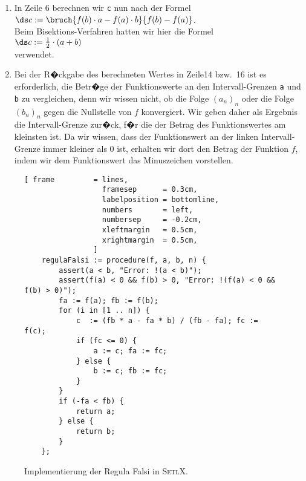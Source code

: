 \begin{enumerate}
\item In Zeile 6 berechnen wir \texttt{c} nun nach der Formel
      \\[0.2cm]
      \hspace*{1.3cm}
      $\ds c := \bruch{f(b) \cdot a - f(a) \cdot b}{f(b) - f(a)}$. 
      \\[0.2cm]
      Beim Bisektions-Verfahren hatten wir hier die Formel
      \\[0.2cm]
      \hspace*{1.3cm}
      $\ds c := \frac{1}{2} \cdot (a + b)$
      \\[0.2cm]
      verwendet.
\item Bei der R�ckgabe des berechneten Wertes in Zeile14 bzw.~16 ist es erforderlich, die Betr�ge der
      Funktionswerte an den Intervall-Grenzen  \texttt{a} und \texttt{b} zu vergleichen, denn wir
      wissen nicht, ob die Folge $(a_n)_n$ oder die Folge $(b_n)_n$ gegen die Nullstelle von $f$
      konvergiert.  Wir geben daher als Ergebnis die 
      Intervall-Grenze  zur�ck, f�r die der Betrag des Funktionswertes am kleinsten ist.
      Da wir wissen, dass der Funktionswert an der linken Intervall-Grenze immer kleiner als 0
      ist, erhalten wir dort den Betrag der Funktion $f$, indem wir dem Funktionswert das Minuszeichen
      vorstellen. 
\end{enumerate}

\begin{figure}[!ht]
  \centering
\begin{Verbatim}[ frame         = lines, 
                  framesep      = 0.3cm, 
                  labelposition = bottomline,
                  numbers       = left,
                  numbersep     = -0.2cm,
                  xleftmargin   = 0.5cm,
                  xrightmargin  = 0.5cm,
                ]
    regulaFalsi := procedure(f, a, b, n) {
        assert(a < b, "Error: !(a < b)");
        assert(f(a) < 0 && f(b) > 0, "Error: !(f(a) < 0 && f(b) > 0)");
        fa := f(a); fb := f(b); 
        for (i in [1 .. n]) {
            c  := (fb * a - fa * b) / (fb - fa); fc := f(c); 
            if (fc <= 0) {
                a := c; fa := fc; 
            } else {
                b := c; fb := fc; 
            }
        }
        if (-fa < fb) {
            return a;
        } else {
            return b;
        }
    };
\end{Verbatim}
\vspace*{-0.3cm}
  \caption{Implementierung der Regula Falsi in \textsc{SetlX}.}
  \label{fig:regulaFalsi.stlx}
\end{figure} %

